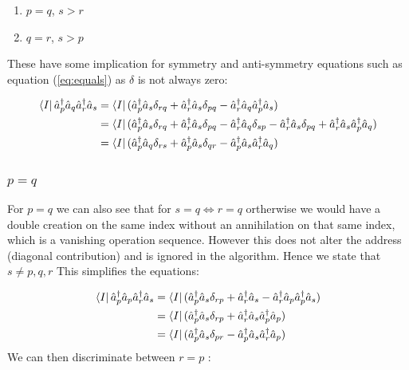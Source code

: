 \begin{enumerate}
  \item $p = q$, $s > r$
  \item $q = r$, $s > p$
\end{enumerate}
These have some implication for symmetry and anti-symmetry equations such as equation (\ref{eq:equals}) as $\delta$ is not always zero:


\begin{align}
   \bra{I}  \hat{a}^\dagger_p \hat{a}_q \hat{a}^\dagger_r \hat{a}_s & =   \bra{I} (\hat{a}^\dagger_p \hat{a}_s \delta_{rq} + \hat{a}^\dagger_r  \hat{a}_s \delta_{pq} - \hat{a}^\dagger_r \hat{a}_q \hat{a}^\dagger_p \hat{a}_s) \\
  & =   \bra{I} (\hat{a}^\dagger_p \hat{a}_s \delta_{rq} + \hat{a}^\dagger_r \hat{a}_s \delta_{pq} - \hat{a}^\dagger_r \hat{a}_q  \delta_{sp} - \hat{a}^\dagger_r \hat{a}_s \delta_{pq} + \hat{a}^\dagger_r \hat{a}_s \hat{a}^\dagger_p \hat{a}_q) \\
  & =   \bra{I} (\hat{a}^\dagger_p \hat{a}_q \delta_{rs} + \hat{a}^\dagger_p \hat{a}_s \delta_{qr} - \hat{a}^\dagger_p \hat{a}_s \hat{a}^\dagger_r \hat{a}_q)
\end{align}

\subsubsection{$p = q$} \label{p=q}
For $p = q$ we can also see that for $s = q \iff r = q$ ortherwise we would have a double creation on the same index without an annihilation on that same index, which is a vanishing operation sequence. However this does not alter the address (diagonal contribution) and is ignored in the algorithm. Hence we state that $ s \neq p, q, r $ This simplifies the equations:

\begin{align}
  \bra{I}  \hat{a}^\dagger_p \hat{a}_p \hat{a}^\dagger_r \hat{a}_s & =  \bra{I} (\hat{a}^\dagger_p \hat{a}_s \delta_{rp} + \hat{a}^\dagger_r  \hat{a}_s - \hat{a}^\dagger_r \hat{a}_p \hat{a}^\dagger_p \hat{a}_s) \\
  & =   \bra{I} (\hat{a}^\dagger_p \hat{a}_s \delta_{rp} + \hat{a}^\dagger_r \hat{a}_s \hat{a}^\dagger_p \hat{a}_p) \\
  & =   \bra{I} (\hat{a}^\dagger_p \hat{a}_s \delta_{pr} - \hat{a}^\dagger_p \hat{a}_s \hat{a}^\dagger_r \hat{a}_p)
\end{align}
We can then discriminate between $r = p$ :

